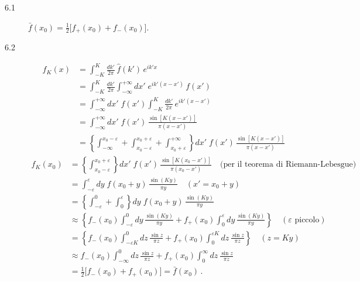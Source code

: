 \documentclass[11pt, a4paper]{book}
\numberwithin{equation}{section}
\begin{document}
\begin{description}
\item[6.1] $\bar{f}(x_0) = \tfrac{1}{2}\bigl[f_+(x_0)+f_-(x_0)\bigr]$.

\item[6.2]
\begin{align*}
  f_K(x) &= \int_{-K}^{K}\frac{dk'}{2\pi}\,\hat{f}(k')\,e^{ik'x}\\
  &= \int_{-K}^{K}\frac{dk'}{2\pi}\int_{-\infty}^{+\infty} dx'\;e^{ik'(x-x')}\,f(x')\\
  &= \int_{-\infty}^{+\infty} dx'\;f(x')\int_{-K}^{K}\frac{dk'}{2\pi}\,e^{ik'(x-x')}\\
  &= \int_{-\infty}^{+\infty} dx'\;f(x')\,\frac{\sin[K(x-x')]}{\pi(x-x')}\\
  &= \left\{\int_{-\infty}^{x_0-\varepsilon}+\int_{x_0-\varepsilon}^{x_0+\varepsilon}+\int_{x_0+\varepsilon}^{+\infty}\right\}dx'\;f(x')\,\frac{\sin[K(x-x')]}{\pi(x-x')}
\end{align*}
\begin{align*}
  f_K(x_0) &= \left\{\int_{x_0-\varepsilon}^{x_0+\varepsilon}\right\}dx'\;f(x')\,\frac{\sin[K(x_0-x')]}{\pi(x_0-x')}
    \quad\text{(per il teorema di Riemann-Lebesgue)}\\
  &= \int_{-\varepsilon}^{\varepsilon} dy\;f(x_0+y)\,\frac{\sin(Ky)}{\pi y} \quad (x'=x_0+y)\\
  &= \left\{\int_{-\varepsilon}^{0}+\int_{0}^{\varepsilon}\right\}dy\;f(x_0+y)\,\frac{\sin(Ky)}{\pi y}\\
  &\approx \left\{f_-(x_0)\int_{-\varepsilon}^{0}dy\,\frac{\sin(Ky)}{\pi y}+f_+(x_0)\int_{0}^{\varepsilon}dy\,\frac{\sin(Ky)}{\pi y}\right\}
    \quad(\varepsilon\text{ piccolo})\\
  &= \left\{f_-(x_0)\int_{-\varepsilon K}^{0}dz\,\frac{\sin z}{\pi z}+f_+(x_0)\int_{0}^{\varepsilon K}dz\,\frac{\sin z}{\pi z}\right\}
    \quad(z=Ky)\\
  &\approx f_-(x_0)\int_{-\infty}^{0}dz\,\frac{\sin z}{\pi z}+f_+(x_0)\int_{0}^{\infty}dz\,\frac{\sin z}{\pi z}\\
  &= \tfrac{1}{2}\bigl[f_-(x_0)+f_+(x_0)\bigr] = \bar{f}(x_0)\,.
\end{align*}


\end{description}
\end{document}
